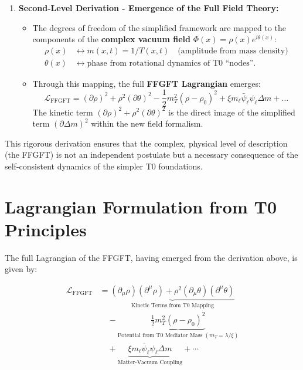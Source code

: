 \begin{enumerate}
		\item \textbf{Second-Level Derivation - Emergence of the Full Field Theory:}
		\begin{itemize}
			\item The degrees of freedom of the simplified framework are mapped to the components of the \textbf{complex vacuum field} \( \Phi(x) = \rho(x) e^{i\theta(x)} \):
			\begin{align*}
				\rho(x) &\leftrightarrow m(x,t) = 1/T(x,t) \quad \text{(amplitude from mass density)} \\
				\theta(x) &\leftrightarrow \text{phase from rotational dynamics of T0 ``nodes''}.
			\end{align*}
			\item Through this mapping, the full \textbf{FFGFT Lagrangian} emerges:
			\[
			\mathcal{L}_{\text{FFGFT}} = (\partial \rho)^2 + \rho^2 (\partial \theta)^2 - \frac{1}{2} m_T^2 (\rho - \rho_0)^2 + \xi m_\ell \bar{\psi}_\ell \psi_\ell \Delta m + \dots
			\]
			The kinetic term \( (\partial \rho)^2 + \rho^2 (\partial \theta)^2 \) is the direct image of the simplified term \( (\partial \Delta m)^2 \) within the new field formalism.
		\end{itemize}
	\end{enumerate}
	
	This rigorous derivation ensures that the complex, physical level of description (the FFGFT) is not an independent postulate but a necessary consequence of the self-consistent dynamics of the simpler T0 foundations.
	
	\section{Lagrangian Formulation from T0 Principles}
	
	The full Lagrangian of the FFGFT, having emerged from the derivation above, is given by:
	
	\begin{align}
		\mathcal{L}_{\text{FFGFT}} &= \underbrace{(\partial_\mu \rho)(\partial^\mu \rho) + \rho^2 (\partial_\mu \theta)(\partial^\mu \theta)}_{\text{Kinetic Terms from T0 Mapping}} \\
		&\quad - \underbrace{\frac{1}{2} m_T^2 (\rho - \rho_0)^2}_{\text{Potential from T0 Mediator Mass } (m_T = \lambda / \xi)} \\
		&\quad + \underbrace{\xi m_\ell \bar{\psi}_\ell \psi_\ell \Delta m}_{\text{Matter-Vacuum Coupling}} + \cdots
	\end{align}
	
